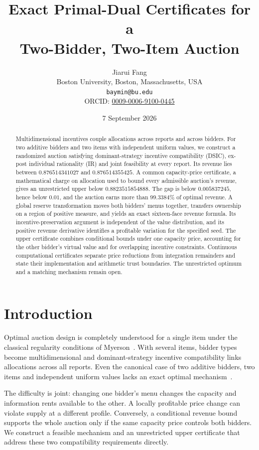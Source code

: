 \documentclass[11pt]{article}
\title{Exact Primal-Dual Certificates for a\\
Two-Bidder, Two-Item Auction}
\author{Jiarui Fang\\
Boston University, Boston, Massachusetts, USA\\
\texttt{baymin@bu.edu}\\
ORCID: \href{https://orcid.org/0009-0006-9100-0445}{0009-0006-9100-0445}}
\date{7 September 2026}
\begin{document}
\maketitle

\begin{abstract}
Multidimensional incentives couple allocations across reports and across bidders.
For two additive bidders and two items with independent uniform values, we
construct a randomized auction satisfying dominant-strategy incentive
compatibility (DSIC), ex-post individual rationality (IR) and joint feasibility
at every report. Its revenue lies between $0.876514341027$ and
$0.876514355425$. A common capacity-price certificate, a mathematical charge
on allocation used to bound every admissible auction's revenue, gives an
unrestricted upper below $0.8823515854888$. The gap is below $0.005837245$,
hence below $0.01$, and the auction earns more than $99.3384\%$ of optimal
revenue. A global reserve transformation moves both bidders' menus together,
transfers ownership on a region of positive measure, and yields an exact
sixteen-face revenue formula. Its incentive-preservation argument is
independent of the value distribution, and its positive revenue derivative
identifies a profitable variation for the specified seed. The upper
certificate combines conditional bounds under one capacity price, accounting
for the other bidder's virtual value and for overlapping incentive constraints.
Continuous computational certificates separate price reductions from
integration remainders and state their implementation and arithmetic trust
boundaries. The unrestricted optimum and a matching mechanism remain open.
\end{abstract}

\section{Introduction}
Optimal auction design is completely understood for a single item under the
classical regularity conditions of Myerson~\citep{myerson1981}. With several
items, bidder types become multidimensional and dominant-strategy incentive
compatibility links allocations across all reports. Even the canonical case
of two additive bidders, two items and independent uniform values lacks an
exact optimal mechanism~\citep{sandholm2015,jiang2026duality}.

The difficulty is joint: changing one bidder's menu changes the capacity and
information rents available to the other. A locally profitable price change
can violate supply at a different profile. Conversely, a conditional revenue
bound supports the whole auction only if the same capacity price controls
both bidders. We construct a feasible mechanism and an unrestricted upper
certificate that address these two compatibility requirements directly.
\end{document}
